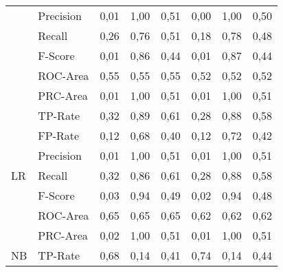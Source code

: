\documentclass[master,twoside,extern,palatino]{rgseThesis}
\begin{document}
\begin{table}[ht]
{\begin{tabular}{|ll|rrr|rrr|}
                     & Precision & 0,01             & 1,00                 & 0,51                     & 0,00             & 1,00                 & 0,50                      \\
                     & Recall    & 0,26             & 0,76                 & 0,51                     & 0,18             & 0,78                 & 0,48                      \\
                     & F-Score   & 0,01             & 0,86                 & 0,44                     & 0,01             & 0,87                 & 0,44                      \\
                     & ROC-Area  & 0,55             & 0,55                 & 0,55                     & 0,52             & 0,52                 & 0,52                      \\
                     & PRC-Area  & 0,01             & 1,00                 & 0,51                     & 0,01             & 1,00                 & 0,51                      \\ 
\hline
\multirow{7}{*}{LR}  & TP-Rate   & 0,32             & 0,89                 & 0,61                     & 0,28             & 0,88                 & 0,58                      \\
                     & FP-Rate   & 0,12             & 0,68                 & 0,40                     & 0,12             & 0,72                 & 0,42                      \\
                     & Precision & 0,01             & 1,00                 & 0,51                     & 0,01             & 1,00                 & 0,51                      \\
                     & Recall    & 0,32             & 0,86                 & 0,61                     & 0,28             & 0,88                 & 0,58                      \\
                     & F-Score   & 0,03             & 0,94                 & 0,49                     & 0,02             & 0,94                 & 0,48                      \\
                     & ROC-Area  & 0,65             & 0,65                 & 0,65                     & 0,62             & 0,62                 & 0,62                      \\
                     & PRC-Area  & 0,02             & 1,00                 & 0,51                     & 0,01             & 1,00                 & 0,51                      \\ 
\hline
\multirow{7}{*}{NB}  & TP-Rate   & 0,68             & 0,14                 & 0,41                     & 0,74             & 0,14                 & 0,44                      \\

\end{tabular}}
\end{table}
\end{document}
